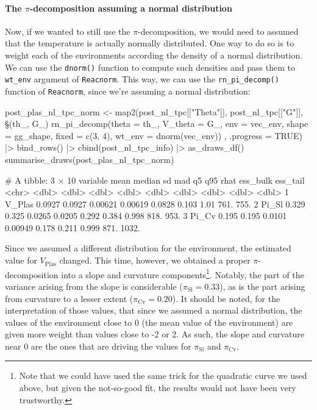\documentclass[a4paper,12pt,twoside]{article}
\begin{document}
\paragraph{The $\pi$-decomposition assuming a normal distribution}
Now, if we wanted to still use the $\pi$-decomposition, we would need to assumed that the temperature is actually normally distributed.
One way to do so is to weight each of the environments according the density of a normal distribution.
We can use the \texttt{dnorm()} function to compute such densities and pass them to \texttt{wt\_env} argument of \texttt{Reacnorm}.
This way, we can use the \texttt{rn\_pi\_decomp()} function of \texttt{Reacnorm}, since we're assuming a normal distribution:
\begin{Rinput}
post_plas_nl_tpc_norm <-
    map2(post_nl_tpc[["Theta"]], post_nl_tpc[["G"]],
         \§§(th_, G_) { rn_pi_decomp(theta    = th_,
                                   V_theta  = G_,
                                   env      = vec_env,
                                   shape    = gg_shape,
                                   fixed    = c(3, 4),
                                   wt_env   = dnorm(vec_env)) },
         .progress = TRUE) |>
    bind_rows() |>
    cbind(post_nl_tpc_info) |>
    as_draws_df()
summarise_draws(post_plas_nl_tpc_norm)
\end{Rinput}
\begin{Routput}
# A tibble: 3 × 10
  variable   mean median      sd     mad     q5   q95  rhat ess_bulk ess_tail
  <chr>     <dbl>  <dbl>   <dbl>   <dbl>  <dbl> <dbl> <dbl>    <dbl>    <dbl>
1 V_Plas   0.0927 0.0927 0.00621 0.00619 0.0828 0.103 1.01      761.     755.
2 Pi_Sl    0.329  0.325  0.0265  0.0205  0.292  0.384 0.998     818.     953.
3 Pi_Cv    0.195  0.195  0.0101  0.00949 0.178  0.211 0.999     871.    1032.
\end{Routput}
Since we assumed a different distribution for the environment, the estimated value for $V_{\text{Plas}}$ changed.
This time, however, we obtained a proper $\pi$-decomposition into a slope and curvature components\footnote{Note that we could have used the same trick for the quadratic curve we used above, but given the not-so-good fit, the results would not have been very trustworthy.}.
Notably, the part of the variance arising from the slope is considerable ($\pi_{\text{Sl}} = 0.33$), as is the part arising from curvature to a lesser extent ($\pi_{\text{Cv}} = 0.20$).
It should be noted, for the interpretation of those values, that since we assumed a normal distribution, the values of the environment close to 0 (the mean value of the environment) are given more weight than values close to -2 or 2.
As such, the slope and curvature near 0 are the ones that are driving the values for $\pi_{\text{Sl}}$ and $\pi_{\text{Cv}}$.
\end{document}
